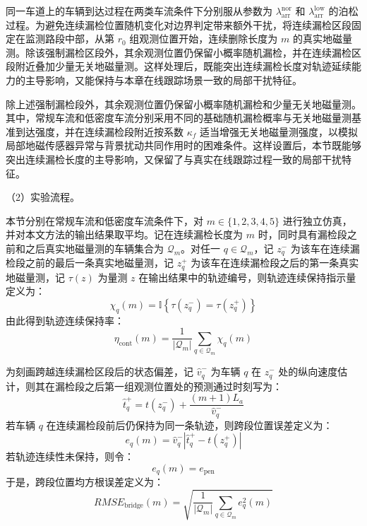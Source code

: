 \documentclass{xdupgthesis}
\begin{document}
同一车道上的车辆到达过程在两类车流条件下分别服从参数为 $\lambda_{\mathrm{arr}}^{\mathrm{nor}}$ 和 $\lambda_{\mathrm{arr}}^{\mathrm{low}}$ 的泊松过程。为避免连续漏检位置随机变化对边界判定带来额外干扰，将连续漏检区段固定在监测路段中部，从第 $r_0$ 组观测位置开始，连续删除长度为 $m$ 的真实地磁量测。除该强制漏检区段外，其余观测位置仍保留小概率随机漏检，并在连续漏检区段附近叠加少量无关地磁量测。这样处理后，既能突出连续漏检长度对轨迹延续能力的主导影响，又能保持与本章在线跟踪场景一致的局部干扰特征。

除上述强制漏检段外，其余观测位置仍保留小概率随机漏检和少量无关地磁量测。其中，常规车流和低密度车流分别采用不同的基础随机漏检概率与无关地磁量测基准到达强度，并在连续漏检段附近按系数 $\kappa_f$ 适当增强无关地磁量测强度，以模拟局部地磁传感器异常与背景扰动共同作用时的困难条件。这样设置后，本节既能够突出连续漏检长度的主导影响，又保留了与真实在线跟踪过程一致的局部干扰特征。

\noindent （2）实验流程。

本节分别在常规车流和低密度车流条件下，对 $m\in\{1,2,3,4,5\}$ 进行独立仿真，并对本文方法的输出结果取平均。记在连续漏检长度为 $m$ 时，同时具有漏检段之前和之后真实地磁量测的车辆集合为 $\mathcal Q_m$。对任一 $q\in\mathcal Q_m$，记 $z_q^{-}$ 为该车在连续漏检段之前的最后一条真实地磁量测，记 $z_q^{+}$ 为该车在连续漏检段之后的第一条真实地磁量测，记 $\tau(z)$ 为量测 $z$ 在输出结果中的轨迹编号，则轨迹连续保持指示量定义为：
\begin{equation}
	\chi_q(m)
	=
	\mathbb I\left\{\tau(z_q^{-})=\tau(z_q^{+})\right\}
\end{equation}
由此得到轨迹连续保持率：
\begin{equation}
	\eta_{\mathrm{cont}}(m)
	=
	\frac{1}{\left|\mathcal Q_m\right|}
	\sum_{q\in\mathcal Q_m}\chi_q(m)
\end{equation}

为刻画跨越连续漏检区段后的状态偏差，记 $\hat v_q^{-}$ 为车辆 $q$ 在 $z_q^{-}$ 处的纵向速度估计，则其在漏检段之后第一组观测位置处的预测通过时刻写为：
\begin{equation}
	\hat t_q^{+}
	=
	t(z_q^{-})+\frac{(m+1)L_a}{\hat v_q^{-}}
\end{equation}
若车辆 $q$ 在连续漏检段前后仍保持为同一条轨迹，则跨段位置误差定义为：
\begin{equation}
	e_q(m)
	=
	\hat v_q^{-}\left|\hat t_q^{+}-t(z_q^{+})\right|
\end{equation}
若轨迹连续性未保持，则令：
\begin{equation}
	e_q(m)
	=
	e_{\mathrm{pen}}
\end{equation}
于是，跨段位置均方根误差定义为：
\begin{equation}
	RMSE_{\mathrm{bridge}}(m)
	=
	\sqrt{
		\frac{1}{\left|\mathcal Q_m\right|}
		\sum_{q\in\mathcal Q_m}e_q^2(m)
	}
\end{equation}
\end{document}
